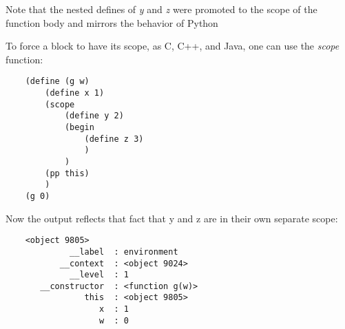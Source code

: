 Note that the nested defines of {\it y} and {\it z} were promoted
to the scope of the function body and mirrors the behavior of Python

To force a block to have its scope, as C, C++, and Java,
one can use the {\it scope} function:

\begin{verbatim}
    (define (g w)
        (define x 1)
        (scope
            (define y 2)
            (begin
                (define z 3)
                )
            )
        (pp this)
        )
    (g 0)
\end{verbatim}

Now the output reflects that fact that y and z are in their own
separate scope:

\begin{verbatim}
    <object 9805>
             __label  : environment
           __context  : <object 9024>
             __level  : 1
       __constructor  : <function g(w)>
                this  : <object 9805>
                   x  : 1
                   w  : 0
\end{verbatim}

